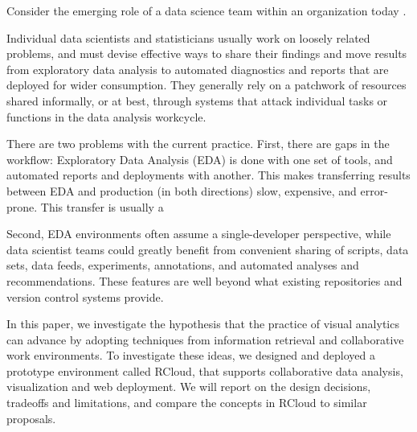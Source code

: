 

\maketitle


Consider the emerging role of a data science team within an
organization today \cite{Keim:2008:VAS}.

Individual data scientists and statisticians usually work on loosely
related problems, and must devise effective ways to share their findings
and move results from exploratory data analysis to automated diagnostics
and reports that are deployed for wider consumption.
They generally rely on a patchwork of resources shared informally,
or at best, through systems that attack individual tasks or functions
in the data analysis workcycle. %

There are two problems with the current
practice. First, there are gaps in the workflow:
Exploratory Data Analysis (EDA) is done with one set of tools,
and automated reports and deployments with another. This makes
transferring results between EDA and production (in both directions)
slow, expensive, and error-prone. This transfer is usually  a

Second, EDA environments often assume a single-developer perspective,
while data scientist teams could greatly benefit from convenient sharing of
scripts, data sets, data feeds, experiments, annotations, and automated
analyses and recommendations. These features are well beyond what existing
repositories and version control systems provide.

 In this paper, we investigate the hypothesis
that the practice of visual analytics can advance by adopting techniques
from information retrieval and collaborative work environments. To investigate
these ideas, we designed and deployed a prototype environment called RCloud,
that supports collaborative data analysis, visualization and web deployment.
We will report on the design decisions, tradeoffs and limitations, and compare
the concepts in RCloud to similar proposals.


